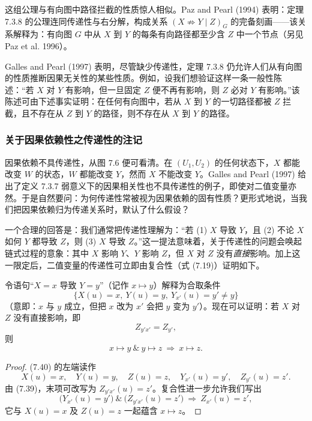 这组公理与有向图中路径拦截的性质惊人相似。Paz and Pearl (1994) 表明：定理 7.3.8 的公理连同传递性与右分解，构成关系 $(X\nRightarrow Y\mid Z)_G$ 的完备刻画——该关系解释为：有向图 $G$ 中从 $X$ 到 $Y$ 的每条有向路径都至少含 $Z$ 中一个节点（另见 Paz et al. 1996）。

Galles and Pearl (1997) 表明，尽管缺少传递性，定理 7.3.8 仍允许人们从有向图的性质推断因果无关性的某些性质。例如，设我们想验证这样一条一般性陈述：“若 $X$ 对 $Y$ 有影响，但一旦固定 $Z$ 便不再有影响，则 $Z$ 必对 $Y$ 有影响。”该陈述可由下述事实证明：在任何有向图中，若从 $X$ 到 $Y$ 的一切路径都被 $Z$ 拦截，且不存在从 $Z$ 到 $Y$ 的路径，则不存在从 $X$ 到 $Y$ 的路径。

\subsubsection*{关于因果依赖性之传递性的注记}

因果依赖不具传递性，从图 7.6 便可看清。在 $(U_1,U_2)$ 的任何状态下，$X$ 都能改变 $W$ 的状态，$W$ 都能改变 $Y$，然而 $X$ 不能改变 $Y$。Galles and Pearl (1997) 给出了定义 7.3.7 弱意义下的因果相关性也不具传递性的例子，即使对二值变量亦然。于是自然要问：为何传递性常被视为因果依赖的固有性质？更形式地说，当我们把因果依赖归为传递关系时，默认了什么假设？

一个合理的回答是：我们通常把传递性理解为：“若 (1) $X$ 导致 $Y$，且 (2) 不论 $X$ 如何 $Y$ 都导致 $Z$，则 (3) $X$ 导致 $Z$。”这一提法意味着，关于传递性的问题会唤起链式过程的意象：其中 $X$ 影响 $Y$、$Y$ 影响 $Z$，但 $X$ 对 $Z$ 没有\emph{直接}影响。加上这一限定后，二值变量的传递性可立即由复合性（式 \textup{(7.19)}）证明如下。

令语句“$X=x$ 导致 $Y=y$”（记作 $x\mapsto y$）解释为合取条件
\[
\bigl\{X(u)=x,\ Y(u)=y,\ Y_{x'}(u)=y'\ne y\bigr\}
\]
（意即：$x$ 与 $y$ 成立，但把 $x$ 改为 $x'$ 会把 $y$ 变为 $y'$）。现在可以证明：若 $X$ 对 $Z$ 没有直接影响，即
\begin{equation}
Z_{y'x'}=Z_{y'}, \tag{7.39}
\end{equation}
则
\begin{equation}
x\mapsto y\ \&\ y\mapsto z\ \Longrightarrow\ x\mapsto z. \tag{7.40}
\end{equation}

\begin{proof}
\textup{(7.40)} 的左端读作
\[
X(u)=x,\quad Y(u)=y,\quad Z(u)=z,\quad Y_{x'}(u)=y',\quad Z_{y'}(u)=z'.
\]
由 \textup{(7.39)}，末项可改写为 $Z_{y'x'}(u)=z'$。复合性进一步允许我们写出
\[
\bigl(Y_{x'}(u)=y'\bigr)\ \&\ \bigl(Z_{y'x'}(u)=z'\bigr)\ \Longrightarrow\ Z_{x'}(u)=z',
\]
它与 $X(u)=x$ 及 $Z(u)=z$ 一起蕴含 $x\mapsto z$。
\end{proof}


